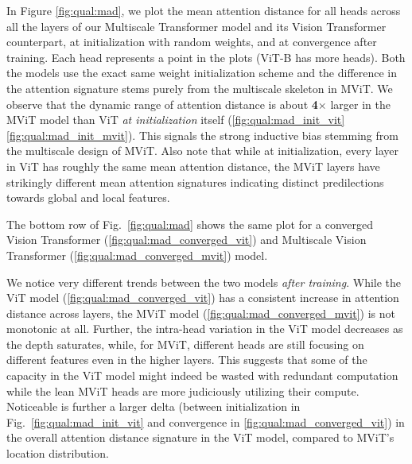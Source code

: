 \documentclass[10pt,twocolumn,letterpaper]{article}
\newcommand{\figref}[1]{Fig.~\ref{#1}}
\def\x{$\times$}
\begin{document}
In Figure \ref{fig:qual:mad}, we plot the mean attention distance for all heads across all the layers of our Multiscale Transformer model and its Vision Transformer counterpart, at initialization with random weights, and at convergence after training. Each head represents a point in the plots (ViT-B has more heads). Both the models use the exact same weight initialization scheme and the difference in the attention signature stems purely from the multiscale skeleton in MViT. 
We observe that the dynamic range of attention distance is about \textbf{4\x} larger in the MViT model than ViT \textit{at initialization} itself (\ref{fig:qual:mad_init_vit} \vs  \ref{fig:qual:mad_init_mvit}). This signals the strong inductive bias stemming from the multiscale design of MViT. Also note that while at initialization, every layer in ViT has roughly the same mean attention distance, the MViT layers have strikingly different mean attention signatures indicating distinct predilections towards global and local features. 

The bottom row of \figref{fig:qual:mad} shows the same plot for a converged Vision Transformer (\ref{fig:qual:mad_converged_vit}) and Multiscale Vision Transformer  (\ref{fig:qual:mad_converged_mvit}) model. 

We notice very different trends between the two models\textit{ after training}. While the ViT model  (\ref{fig:qual:mad_converged_vit}) has a consistent increase in attention distance across layers, the MViT model  (\ref{fig:qual:mad_converged_mvit}) is not monotonic at all. Further, the intra-head variation in the ViT model decreases as the depth saturates, while, for MViT, different heads are still focusing on different features even in the higher layers. This suggests that some of the capacity in the ViT model might indeed be wasted with redundant computation while the lean MViT heads are more judiciously utilizing their compute. Noticeable is further a larger delta (between initialization in \figref{fig:qual:mad_init_vit} and convergence in \ref{fig:qual:mad_converged_vit}) in the overall attention distance signature in the ViT model, compared to MViT's location distribution. 
\end{document}
